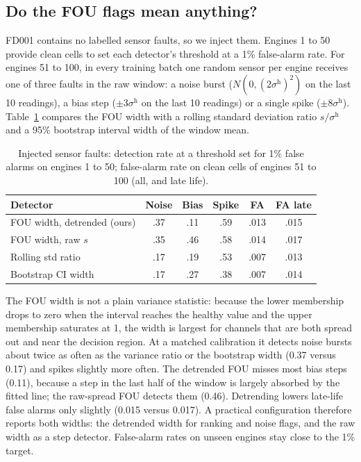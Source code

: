 \documentclass[journal,10pt,twocolumn]{IEEEtran}
\begin{document}
\subsection{Do the FOU flags mean anything?}
\label{sec:fault}
FD001 contains no labelled sensor faults, so we inject them. Engines 1 to 50 provide clean cells to set each detector's threshold at a 1\% false-alarm rate. For engines 51 to 100, in every training batch one random sensor per engine receives one of three faults in the raw window: a noise burst ($N(0,(2\sigma^{\mathrm h})^2)$ on the last 10 readings), a bias step ($\pm3\sigma^{\mathrm h}$ on the last 10 readings) or a single spike ($\pm8\sigma^{\mathrm h}$). Table~\ref{tab:fault} compares the FOU width with a rolling standard deviation ratio $s/\sigma^{\mathrm h}$ and a 95\% bootstrap interval width of the window mean.

\begin{table}[t]
\centering
\footnotesize
\caption{Injected sensor faults: detection rate at a threshold set for 1\% false alarms on engines 1 to 50; false-alarm rate on clean cells of engines 51 to 100 (all, and late life).}
\label{tab:fault}
\setlength{\tabcolsep}{3pt}
\begin{tabular}{lccccc}
\toprule
Detector & Noise & Bias & Spike & FA & FA late \\
\midrule
FOU width, detrended (ours) & .37 & .11 & .59 & .013 & .015 \\
FOU width, raw $s$ & .35 & .46 & .58 & .014 & .017 \\
Rolling std ratio & .17 & .19 & .53 & .007 & .013 \\
Bootstrap CI width & .17 & .27 & .38 & .007 & .014 \\
\bottomrule
\end{tabular}
\end{table}
The FOU width is not a plain variance statistic: because the lower membership drops to zero when the interval reaches the healthy value and the upper membership saturates at 1, the width is largest for channels that are both spread out and near the decision region. At a matched calibration it detects noise bursts about twice as often as the variance ratio or the bootstrap width (0.37 versus 0.17) and spikes slightly more often. The detrended FOU misses most bias steps (0.11), because a step in the last half of the window is largely absorbed by the fitted line; the raw-spread FOU detects them (0.46). Detrending lowers late-life false alarms only slightly (0.015 versus 0.017). A practical configuration therefore reports both widths: the detrended width for ranking and noise flags, and the raw width as a step detector. False-alarm rates on unseen engines stay close to the 1\% target.
\end{document}
